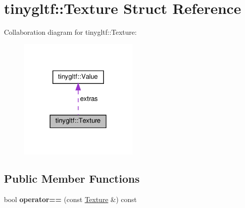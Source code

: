 \hypertarget{structtinygltf_1_1Texture}{}\section{tinygltf\+:\+:Texture Struct Reference}
\label{structtinygltf_1_1Texture}


Collaboration diagram for tinygltf\+:\+:Texture\+:\nopagebreak
\begin{figure}[H]
\begin{center}
\leavevmode
\includegraphics[width=165pt]{structtinygltf_1_1Texture__coll__graph}
\end{center}
\end{figure}
\subsection*{Public Member Functions}
\begin{DoxyCompactItemize}
\item 
\mbox{\label{structtinygltf_1_1Texture_afc25d2f666e21ece0e945092e74cd44c}} 
bool {\bfseries operator==} (const \hyperlink{structtinygltf_1_1Texture}{Texture} \&) const
\end{DoxyCompactItemize}
